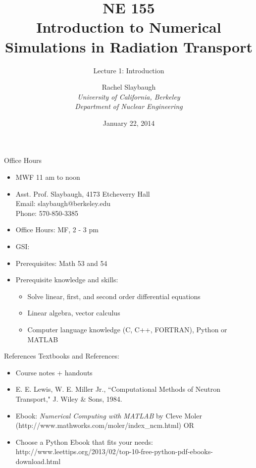 \documentclass[xcolor=x11names,compress]{beamer}
\renewcommand{\(}{\begin{columns}}
\renewcommand{\)}{\end{columns}}
\newcommand{\<}[1]{\begin{column}{#1}}
\renewcommand{\>}{\end{column}}
\begin{document}
\begin{frame}
\title{NE 155\\Introduction to Numerical Simulations in Radiation Transport}
\subtitle{Lecture 1: Introduction}
\author{
        Rachel Slaybaugh\\
        \vspace*{1em}
        {\it University of California, Berkeley\\
         Department of Nuclear Engineering}\\
}
\date{January 22, 2014}
\titlepage
\end{frame}

\begin{frame}{Office Hours}
\begin{itemize}
\item MWF 11 am to noon
\item Asst. Prof. Slaybaugh, 4173 Etcheverry Hall\\
      Email: slaybaugh@berkeley.edu \\
      Phone: 570-850-3385
\item Office Hours: MF, 2 - 3 pm
\item GSI: 
\item Prerequisites: Math 53 and 54
\item Prerequisite knowledge and skills: 
\begin{itemize}
\item Solve linear, first, and second order differential equations
\item Linear algebra, vector calculus
\item Computer language knowledge (C, C++, FORTRAN), Python or MATLAB	
\end{itemize}
\end{itemize}
\end{frame}

\begin{frame}{References}
Textbooks and References:
\begin{itemize}
\item Course notes + handouts
\item E. E. Lewis, W. E. Miller Jr., ``Computational Methods of Neutron Transport," J. Wiley \& Sons, 1984.
\item Ebook: \emph{Numerical Computing with MATLAB} by Cleve Moler (http://www.mathworks.com/moler/index\_ncm.html) OR
\item Choose a Python Ebook that fits your needs:
http://www.leettips.org/2013/02/top-10-free-python-pdf-ebooks-download.html
\end{itemize}
\end{frame}
\end{document}
